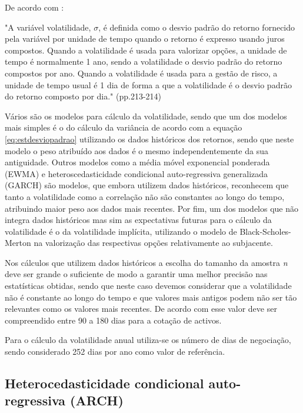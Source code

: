 \documentclass[
  12pt,
  a4paper,
  openany]{book}
\theoremstyle{definition}
\theoremstyle{definition}
\theoremstyle{definition}
\theoremstyle{remark}
\begin{document}
De acordo com \citet{HullRisk2018}:

\begin{spacing}{1}
\begin{adjustwidth}{28.3464pt}{28.3464pt}\footnotesize
"A variável volatilidade, $\sigma$, é definida como o desvio padrão do retorno fornecido pela variável por unidade de tempo quando o retorno é expresso usando juros compostos. Quando a volatilidade é usada para valorizar opções, a unidade de tempo é normalmente 1 ano, sendo a volatilidade o desvio padrão do retorno compostos por ano. Quando a volatilidade é usada para a gestão de risco, a unidade de tempo usual é 1 dia de forma a que a volatilidade é o desvio padrão do retorno composto por dia." (pp.213-214)
\normalsize\end{adjustwidth}
\end{spacing}
\medskip

Vários são os modelos para cálculo da volatilidade, sendo que um dos modelos mais simples é o do cálculo da variância de acordo com a equação \eqref{eq:estdesviopadrao} utilizando os dados históricos dos retornos, sendo que neste modelo o peso atribuído aos dados é o mesmo independentemente da sua antiguidade. Outros modelos como a média móvel exponencial ponderada (EWMA) e heteroscedasticidade condicional auto-regressiva generalizada (GARCH) são modelos, que embora utilizem dados históricos, reconhecem que tanto a volatilidade como a correlação não são constantes ao longo do tempo, atribuindo maior peso aos dados mais recentes. Por fim, um dos modelos que não integra dados históricos mas sim as expectativas futuras para o cálculo da volatilidade é o da volatilidade implícita, utilizando o modelo de Black-Scholes-Merton na valorização das respectivas opções relativamente ao subjacente.

Nos cálculos que utilizem dados históricos a escolha do tamanho da amostra \emph{n} deve ser grande o suficiente de modo a garantir uma melhor precisão nas estatísticas obtidas, sendo que neste caso devemos considerar que a volatilidade não é constante ao longo do tempo e que valores mais antigos podem não ser tão relevantes como os valores mais recentes. De acordo com \citep{Hull2018} esse valor deve ser compreendido entre 90 a 180 dias para a cotação de activos.

Para o cálculo da volatilidade anual utiliza-se os número de dias de negociação, sendo considerado 252 dias por ano como valor de referência.

\hypertarget{heterocedasticidade-condicional-auto-regressiva-arch}{%
\subsection{Heterocedasticidade condicional auto-regressiva (ARCH)}\label{heterocedasticidade-condicional-auto-regressiva-arch}}
\end{document}
